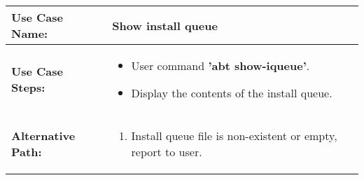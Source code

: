 \medskip

\begin{tabularx}{\linewidth}{|l|X|}
\hline
\textbf{Use Case Name:} & \textbf{Show install queue} \\
\hline
\textbf{Use Case Steps:} & 
\begin{minipage}{\linewidth} 
  \vspace{0.05em}
  \begin{itemize}
    \item User command \textbf{'abt show-iqueue'}.
    \item Display the contents of the install queue.
  \end{itemize}
  \vspace{0.05em}
\end{minipage}
\\
\hline 
\textbf{Alternative Path:} &
\begin{minipage}{\linewidth}
  \vspace{0.05em} 
  \begin{enumerate}
    \item Install queue file is non-existent or empty, report to user.
  \end{enumerate}
  \vspace{0.05em} 
\end{minipage}
\\
\hline
\end{tabularx}
